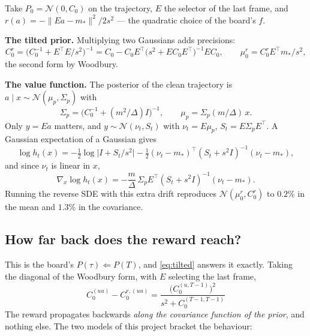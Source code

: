 \documentclass[11pt]{article}
\theoremstyle{plain}
\theoremstyle{remark}
\newcommand{\N}{\mathcal{N}}
\newcommand{\T}{^{\!\top}}
\begin{document}
Take $P_0 = \N(0, C_0)$ on the trajectory, $E$ the selector of the last frame,
and $r(a) = -\|Ea - m_*\|^2/2s^2$ --- the quadratic choice of the board's $f$.

\textbf{The tilted prior.} Multiplying two Gaussians adds precisions:
\begin{equation}
  C_0^r = \bigl(C_0^{-1} + E\T E/s^2\bigr)^{-1}
        = C_0 - C_0 E\T\bigl(s^2 + E C_0 E\T\bigr)^{-1} E C_0,
  \qquad \mu_0^r = C_0^r E\T m_*/s^2,
  \label{eq:tilted}
\end{equation}
the second form by Woodbury.

\textbf{The value function.} The posterior of the clean trajectory is
$a\mid x \sim \N(\mu_p, \Sigma_p)$ with
\begin{equation}
  \Sigma_p = \bigl(C_0^{-1} + (m^2/\Delta) I\bigr)^{-1},
  \qquad \mu_p = \Sigma_p (m/\Delta)\, x .
\end{equation}
Only $y = Ea$ matters, and $y \sim \N(\nu_t, S_t)$ with $\nu_t = E\mu_p$,
$S_t = E\Sigma_p E\T$. A Gaussian expectation of a Gaussian gives
\begin{equation}
  \log h_t(x) = -\tfrac12\log\bigl|I + S_t/s^2\bigr|
  - \tfrac12 (\nu_t - m_*)\T (S_t + s^2 I)^{-1}(\nu_t - m_*),
  \label{eq:logh}
\end{equation}
and since $\nu_t$ is linear in $x$,
\begin{equation}
  \nabla_x \log h_t(x)
  = -\frac{m}{\Delta}\, \Sigma_p E\T (S_t + s^2 I)^{-1}(\nu_t - m_*).
  \label{eq:gradlogh}
\end{equation}
Running the reverse SDE with this extra drift reproduces $\N(\mu_0^r, C_0^r)$ to
$0.2\%$ in the mean and $1.3\%$ in the covariance.

\subsection{How far back does the reward reach?}

This is the board's $P(\tau) \Leftarrow P(T)$, and \eqref{eq:tilted} answers it
exactly. Taking the diagonal of the Woodbury form, with $E$ selecting the last
frame,
\begin{equation}
  \boxed{\ C_0^{(uu)} - C_0^{r,(uu)}
  = \frac{\bigl(C_0^{(u,T-1)}\bigr)^2}{s^2 + C_0^{(T-1,T-1)}}\ }
  \label{eq:reach}
\end{equation}
The reward propagates backwards \emph{along the covariance function of the
prior}, and nothing else. The two models of this project bracket the behaviour:
\end{document}
